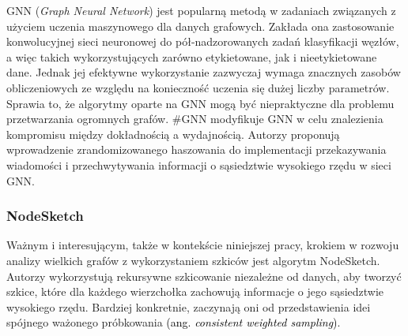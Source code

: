         GNN\cite{4700287} (\textit{Graph Neural Network}) jest popularną metodą w zadaniach związanych z użyciem uczenia maszynowego dla danych grafowych. Zakłada ona zastosowanie konwolucyjnej sieci neuronowej do pół-nadzorowanych zadań klasyfikacji węzłów, a więc takich wykorzystujących zarówno etykietowane, jak i nieetykietowane dane. Jednak jej efektywne wykorzystanie zazwyczaj wymaga znacznych zasobów obliczeniowych ze względu na konieczność uczenia się dużej liczby parametrów. Sprawia to, że algorytmy oparte na GNN mogą być niepraktyczne dla problemu przetwarzania ogromnych grafów. \#GNN\cite{Wu_Li_Luo_Nejdl_2021} modyfikuje GNN w celu znalezienia kompromisu między dokładnością a wydajnością. Autorzy proponują wprowadzenie zrandomizowanego haszowania do implementacji przekazywania wiadomości i przechwytywania  informacji o sąsiedztwie wysokiego rzędu w sieci GNN. 
        
        \subsubsection*{NodeSketch}
            Ważnym i interesującym, także w kontekście niniejszej pracy, krokiem w rozwoju analizy wielkich grafów z wykorzystaniem szkiców jest algorytm NodeSketch\cite{Yang_Rosso_Li_Cudre-Mauroux_2019}. Autorzy wykorzystują rekursywne szkicowanie niezależne od danych, aby tworzyć szkice, które dla każdego wierzchołka zachowują informacje o jego sąsiedztwie wysokiego rzędu. Bardziej konkretnie, zaczynają oni od przedstawienia idei spójnego ważonego próbkowania \textcolor{black}{(ang. \textit{ consistent weighted sampling})}. 
        
